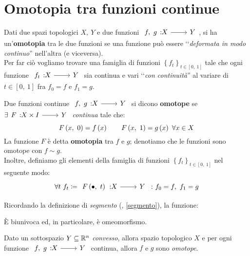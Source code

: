 \section{Omotopia tra funzioni continue}
\begin{intuit}
	Dati due spazi topologici $X,\ Y$ e due funzioni $\funz{f,\ g}{X}{Y}$, si ha un'\textbf{omotopia} tra le due funzioni se una funzione può essere ‘‘\textit{deformata in modo continuo}'' nell'altra (e viceversa).\\
	Per far ciò vogliamo trovare una famiglia di funzioni $\left\{f_t\right\}_{t\in\left[0,\ 1\right]}$ tale che ogni funzione $\funz{f_t}{X}{Y}$ sia continua e vari ‘‘\textit{con continuità}'' al variare di $t\in\left[0,\ 1\right]$ fra $f_0=f$ e $f_1=g$.
\end{intuit}
\begin{define}
	Due funzioni continue $\funz{f,\ g}{X}{Y}$ si dicono \textbf{omotope} se \\ $\exists \funz{F}{X\times I}{Y}$ \textit{continua} tale che:
	\begin{equation}
		F\left(x,\ 0\right)=f\left(x\right)\qquad F\left(x,\ 1\right)=g\left(x\right)\ \forall x\in X
	\end{equation}
La funzione $F$ è detta \textbf{omotopia} tra $f$ e $g$; denotiamo che le funzioni sono omotope con $f\sim g$.\\
Inoltre, definiamo gli elementi della famiglia di funzioni $\left\{f_t\right\}_{t\in\left[0,\ 1\right]}$ nel  seguente modo:
\begin{equation}
\forall t\ f_t\coloneqq \funz{\mvf{F}{\bullet}{t}}{X}{Y}\ \colon f_0=f,\ f_1=g
\end{equation}
\end{define}
\begin{observe}
Ricordando la definizione di \textit{segmento} (\pageref{segmento}, \autoref{segmento}), la funzione:
\begin{center}
\end{center}
È biunivoca ed, in particolare, è omeomorfismo.
\end{observe}
\begin{example}\label{convessoomotope}
	Dato un sottospazio $Y\subseteq \mathbb{R}^n$ \textit{convesso}, allora spazio topologico $X$ e per ogni funzione $\funz{f,\ g}{X}{Y}$ continua, allora $f$ e $g$ sono \textit{omotope}.
\end{example}
